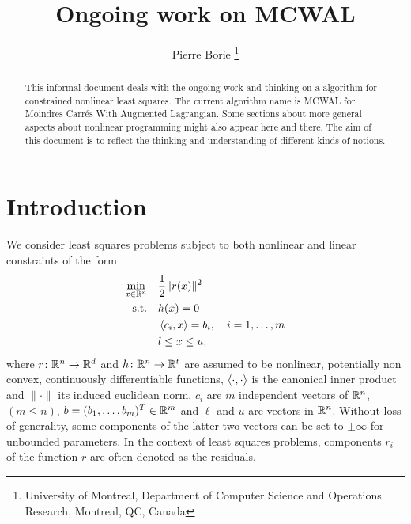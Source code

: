 \documentclass[10pt]{article}
\numberwithin{equation}{section}
\newcommand{\footremember}[2]{%
	\footnote{#2}
	\newcounter{#1}
	\setcounter{#1}{\value{footnote}}%
}
\begin{document}
	
	
	\title{Ongoing work on MCWAL} %
	\author{Pierre Borie\footremember{1}{University of Montreal, Department of Computer Science and Operations Research, Montreal, QC, Canada}}
	\date{}
	
	
	
	\maketitle
	\tableofcontents
	
	\begin{abstract}
		\noindent This informal document deals with the ongoing work and thinking on a algorithm for constrained nonlinear least squares. The current algorithm  name is MCWAL for Moindres Carr\'es With Augmented Lagrangian. Some sections about more general aspects about nonlinear programming might also appear here and there. The aim of this document is to reflect the thinking and understanding of different kinds of notions. 
	\end{abstract} %
	

	\section{Introduction}\label{sec:intro}
	
	We consider least squares problems subject to both nonlinear and linear constraints of the form
	\begin{equation}
		\label{eq:model_cnls}
		\begin{aligned}
			\min_{x\in {\mathbb{R}}^n} \quad & \dfrac{1}{2} \|r(x)\|^2 \\
			\text{s.t.} \quad & h(x) = 0 \\
			& \left\langle {c_i} , {x} \right\rangle = b_i,\quad i=1,\ldots,m \\
			& l \le x \le u,
		\end{aligned}
	\end{equation}
	where $r\colon {\mathbb{R}}^n \to {\mathbb{R}}^d$  and $h\colon {\mathbb{R}}^n \to {\mathbb{R}}^t$ are assumed to be nonlinear, potentially non convex, continuously differentiable functions, $\left\langle {\cdot} , {\cdot} \right\rangle$ is the canonical inner product and $\|\cdot\| $  its induced euclidean norm, $c_i$ are $m$  independent vectors of ${\mathbb{R}}^n$, $( m \le n)$, $b=(b_1,\ldots,b_m)^T \in {\mathbb{R}}^m$ and $\ell$ and $u$ are vectors in ${\mathbb{R}}^n$. Without loss of generality, some components of the latter two vectors can be set to $\pm \infty$ for unbounded parameters. In the context of least squares problems, components $r_i$ of the function $r$ are often denoted as the residuals.
	
\end{document}
